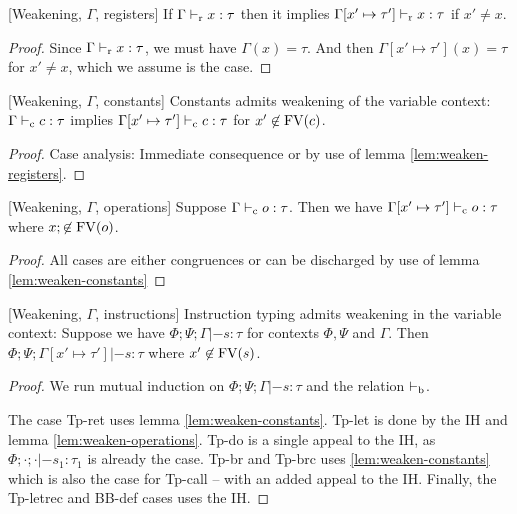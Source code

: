 \documentclass[a4paper, oneside, 10pt, draft]{memoir}
\begin{document}
\begin{lem}{[Weakening, $\Gamma$, registers]}
  \label{lem:weaken-registers}
  If $\Gamma |-_{\mathrm{r}} x : \tau$ then it implies $\Gamma[x' \mapsto \tau']
  |-_{\mathrm{r}} x : \tau$ if $x' \neq x$.
\end{lem}
\begin{proof}
  Since $\Gamma |-_{\mathrm{r}} x : \tau$, we must have $\Gamma(x) = \tau$. And
  then $\Gamma[x' \mapsto \tau'](x) = \tau$ for $x' \neq x$, which we
  assume is the case.
\end{proof}
\begin{lem}{[Weakening, $\Gamma$, constants]}
  \label{lem:weaken-constants}
  Constants admits weakening of the variable context: $\Gamma |-_{\mathrm{c}} c :
  \tau$ implies $\Gamma[x' \mapsto \tau'] |-_{\mathrm{c}} c : \tau$ for $x' \not
  \in \mathrm{FV}(c)$.
\end{lem}
\begin{proof}
  Case analysis: Immediate consequence or by use of lemma \ref{lem:weaken-registers}.
\end{proof}
\begin{lem}{[Weakening, $\Gamma$, operations]}
  \label{lem:weaken-operations}
  Suppose $\Gamma |-_{\mathrm{c}} o : \tau$. Then we have $\Gamma[x' \mapsto
  \tau'] |-_{\mathrm{c}} o : \tau$ where $x; \not \in \mathrm{FV}(o)$.
\end{lem}
\begin{proof}
  All cases are either congruences or can be discharged by use of
  lemma \ref{lem:weaken-constants}
\end{proof}
\begin{lem}{[Weakening, $\Gamma$, instructions]}
  \label{lem:weaken-gamma}
  Instruction typing admits weakening in the variable context: Suppose
  we have $\Phi;\Psi;\Gamma |- s : \tau$ for contexts $\Phi, \Psi$ and
  $\Gamma$. Then $\Phi;\Psi;\Gamma[x' \mapsto \tau'] |- s : \tau$
  where $x' \not \in \mathrm{FV}(s)$.
\end{lem}
\begin{proof}
  We run mutual induction on $\Phi;\Psi;\Gamma |- s : \tau$ and the
  relation $|-_{\mathrm{b}}$.

  The case Tp-ret uses lemma \ref{lem:weaken-constants}. Tp-let is
  done by the IH and lemma \ref{lem:weaken-operations}. Tp-do is a
  single appeal to the IH, as $\Phi;\cdot;\cdot |- s_1 : \tau_1$ is
  already the case. Tp-br and Tp-brc uses \ref{lem:weaken-constants}
  which is also the case for Tp-call -- with an added appeal to the
  IH. Finally, the Tp-letrec and BB-def cases uses the IH.
\end{proof}
\end{document}
